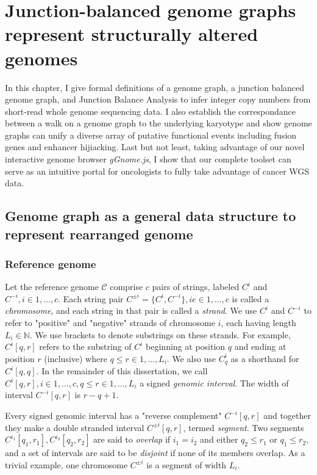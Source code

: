 \documentclass[phd,tocprelim]{cornell}
\begin{document}
\chapter{Junction-balanced genome graphs represent structurally altered genomes}
In this chapter, I give formal definitions of a genome graph, a junction balanced genome graph, and Junction Balance Analysis to infer integer copy numbers from short-read whole genome sequencing data. I also establish the correspondance between a walk on a genome graph to the underlying karyotype and show genome graphs can unify a diverse array of putative functional events including fusion genes and enhancer hijiacking. Last but not least, taking advantage of our novel interactive genome browser \textit{gGnome.js}, I show that our complete toolset can serve as an intuitive portal for oncologists to fully take advantage of cancer WGS data.

\section{Genome graph as a general data structure to represent rearranged genome}
\subsection{Reference genome}
Let the reference genome $\mathcal{C}$ comprise $c$ pairs of strings, labeled $C^i$ and $C^{-i}, i \in 1,\dots,c$. Each string pair $C^{\pm{i}} = \{C^i, C^{-i}\}, i e\in 1,\dots, c$ is called a \textit{chromosome}, and each string in that pair is called a \textit{strand}. We use $C^i$ and $C^{-i}$ to refer to "positive" and "negative" strands of chromosome $i$, each having length $L_i \in \mathbb{N}$. We use brackets to denote substrings on these strands. For example, $C^{i}[q,r]$ refers to the substring of $C^{i}$ beginning at position $q$ and ending at position $r$ (inclusive) where $q \le r \in 1,\dots,L_i$. We also use $C^{i}_q$ as a shorthand for $C^{i}[q,q]$. In the remainder of this dissertation, we call $C^{i}[q,r], i \in 1, \dots, c, q \le r \in 1, \dots, L_i$ a signed \textit{genomic interval}. The width of interval $C^{-i}[q,r]$ is $r-q+1$.

Every signed genomic interval has a "reverse complement" $C^{-i}[q,r]$ and together they make a double stranded interval $C^{\pm{i}}[q,r]$, termed \textit{segment}. Two segments $C^{i_1}[q_1, r_1], C^{i_2}[q_2, r_2]$ are said to \textit{overlap} if $i_1 = i_2$ and either $q_2 \le r_1$ or $q_1 \le r_2$, and a set of intervals are said to be \textit{disjoint} if none of its members overlap. As a trivial example, one chromosome $C^{\pm{i}}$ is a segment of width $L_i$.
\end{document}

